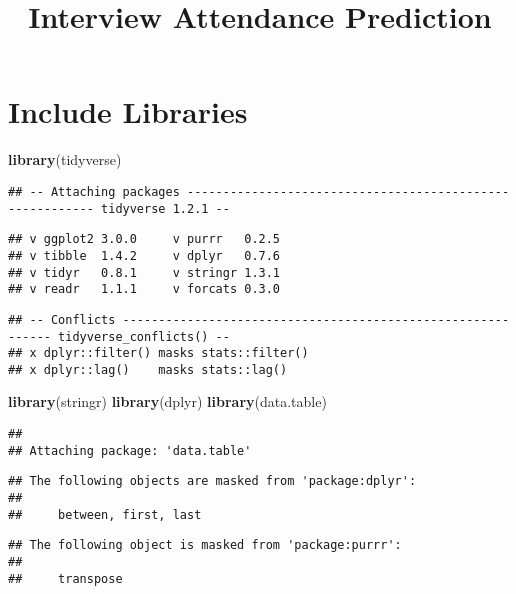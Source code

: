 \documentclass[]{article}
\title{Interview Attendance Prediction}
\author{}
\date{}
\newenvironment{Shaded}{\begin{snugshade}}{\end{snugshade}}
\newcommand{\KeywordTok}[1]{\textcolor[rgb]{0.13,0.29,0.53}{\textbf{#1}}}
\newcommand{\NormalTok}[1]{#1}
\begin{document}
\maketitle

\section{Include Libraries}\label{include-libraries}

\begin{Shaded}
\begin{Highlighting}[]
\KeywordTok{library}\NormalTok{(tidyverse)}
\end{Highlighting}
\end{Shaded}

\begin{verbatim}
## -- Attaching packages --------------------------------------------------------- tidyverse 1.2.1 --
\end{verbatim}

\begin{verbatim}
## v ggplot2 3.0.0     v purrr   0.2.5
## v tibble  1.4.2     v dplyr   0.7.6
## v tidyr   0.8.1     v stringr 1.3.1
## v readr   1.1.1     v forcats 0.3.0
\end{verbatim}

\begin{verbatim}
## -- Conflicts ------------------------------------------------------------ tidyverse_conflicts() --
## x dplyr::filter() masks stats::filter()
## x dplyr::lag()    masks stats::lag()
\end{verbatim}

\begin{Shaded}
\begin{Highlighting}[]
\KeywordTok{library}\NormalTok{(stringr)}
\KeywordTok{library}\NormalTok{(dplyr)}
\KeywordTok{library}\NormalTok{(data.table)}
\end{Highlighting}
\end{Shaded}

\begin{verbatim}
## 
## Attaching package: 'data.table'
\end{verbatim}

\begin{verbatim}
## The following objects are masked from 'package:dplyr':
## 
##     between, first, last
\end{verbatim}

\begin{verbatim}
## The following object is masked from 'package:purrr':
## 
##     transpose
\end{verbatim}
\end{document}
